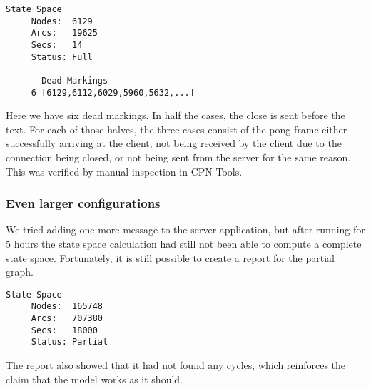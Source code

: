 	\begin{lstlisting}[language={}]
  State Space
     Nodes:  6129
     Arcs:   19625
     Secs:   14
     Status: Full
     
       Dead Markings
     6 [6129,6112,6029,5960,5632,...]
	\end{lstlisting}
	
	Here we have six dead markings. In half the cases, the close is sent before
	the text. For each of those halves, the three cases consist of the pong frame
	either successfully arriving at the client, not being received by the client due
	to the connection being closed, or not being sent from the server for the same
	reason. This was verified by manual inspection in CPN Tools.

	\subsubsection{Even larger configurations}
	We tried adding one more message to the server application, but after running for
	5 hours the state space calculation had still not been able to compute a
	complete state space. Fortunately, it is still possible to create a report for
	the partial graph. 
	\begin{lstlisting}[language={}]
  State Space
     Nodes:  165748
     Arcs:   707380
     Secs:   18000
     Status: Partial
	\end{lstlisting}
	The report also showed that it had not found any cycles, which reinforces the
	claim that the model works as it should.
